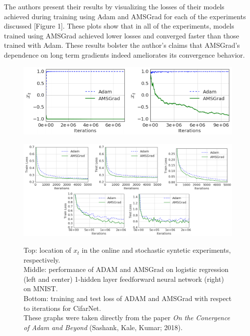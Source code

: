 \documentclass[letterpaper, 10 pt, conference]{ieeeconf}  %
\begin{document}
The authors present their results by visualizing the losses of their models achieved during training using Adam and AMSGrad for each of the experiments discussed [Figure 1]. These plots show that in all of the experiments, models trained using AMSGrad achieved lower losses and converged faster than those trained with Adam. These results bolster the author's claims that AMSGrad's dependence on long term gradients indeed ameliorates its convergence behavior.
\begin{figure}
\begin{minipage}{1\textwidth}
\centering
\begin{minipage}{0.55\textwidth}
  \centering
  \includegraphics[width=1\linewidth]{OG_synthetic.png}
  \label{fig:test2}
\end{minipage}%
\centering
\break
\begin{minipage}{0.9\textwidth}
  \centering
  \includegraphics[width=1\linewidth]{OG_results_nets.png}
  \label{fig:test2}
\end{minipage}%
\end{minipage}
\caption[]{Top: location of $x_t$ in the online and stochastic syntetic experiments, respectively. \\
Middle: performance of ADAM and AMSGrad on logistic regression (left and center) 1-hidden layer feedforward neural network (right) on MNIST.\\
Bottom: training and test loss of ADAM and AMSGrad with respect to iterations for CifarNet.\\
These graphs were taken directly from the paper \emph{On the Conergence of Adam and Beyond} (Sashank, Kale, Kumar; 2018).} 
\end{figure}    
\end{document}
